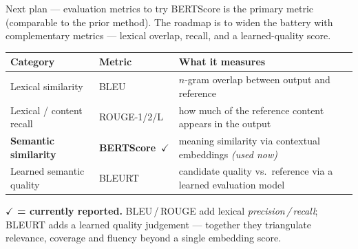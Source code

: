 \documentclass[aspectratio=169,10pt]{beamer}
\newcommand{\hl}[1]{{\bfseries\color{cAccent}#1}}
\begin{document}
\begin{frame}{Next plan --- evaluation metrics to try}
\small
BERTScore is the primary metric (comparable to the prior method). The roadmap is to widen the battery with complementary metrics --- lexical overlap, recall, and a learned-quality score.
\vspace{0.5em}
\centering
{\footnotesize
\begin{tabular}{@{}p{}p{}p{}@{}}
\toprule
\textbf{Category} & \textbf{Metric} & \textbf{What it measures}\\
\midrule
Lexical similarity & BLEU & $n$-gram overlap between output and reference\\[3pt]
Lexical / content recall & ROUGE-1/2/L & how much of the reference content appears in the output\\[3pt]
\textbf{Semantic similarity} & \hl{\textbf{BERTScore}~$\checkmark$} & meaning similarity via contextual embeddings \emph{(used now)}\\[3pt]
Learned semantic quality & BLEURT & candidate quality vs.\ reference via a learned evaluation model\\
\bottomrule
\end{tabular}}
\vspace{0.5em}
{\scriptsize \textbf{$\checkmark$ = currently reported.} BLEU\,/\,ROUGE add lexical \emph{precision\,/\,recall}; BLEURT adds a learned quality judgement --- together they triangulate relevance, coverage and fluency beyond a single embedding score.}
\end{frame}
\end{document}
